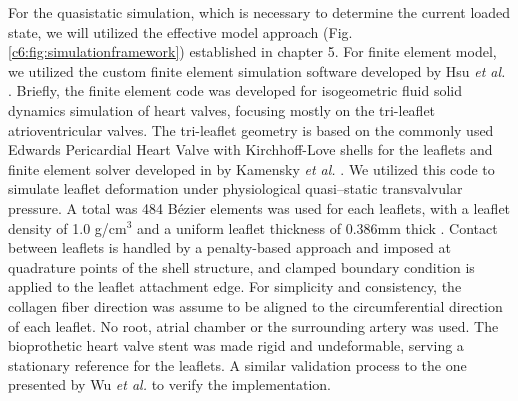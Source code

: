 	For the quasistatic simulation, which is necessary to determine the current loaded state, we will utilized the effective model approach (Fig. \ref{c6:fig:simulationframework}) established in chapter 5. For finite element model, we utilized the custom finite element simulation software developed by Hsu \textit{et al.} \cite{hsu_dynamic_2015, kamensky_immersogeometric_2015, kiendl_isogeometric_2015, wu_anisotropic_2018}. Briefly, the finite element code was developed for isogeometric fluid solid dynamics simulation of heart valves, focusing mostly on the tri-leaflet atrioventricular valves. The tri-leaflet geometry is based on the commonly used Edwards Pericardial Heart Valve with Kirchhoff-Love shells for the leaflets \cite{kiendl_isogeometric_2015} and finite element solver developed in by Kamensky \textit{et al.} \cite {kamensky_immersogeometric_2015}. We utilized this code to simulate leaflet deformation under physiological quasi--static transvalvular pressure. 
    A total was 484 B\'ezier elements was used for each leaflets, with a leaflet density of 1.0 g/cm$^3$ and a uniform leaflet thickness of 0.386mm thick \cite{hsu_dynamic_2015}. Contact between leaflets is handled by a penalty-based approach and imposed at quadrature points of the shell structure, and clamped boundary condition is applied to the leaflet attachment edge. 
    For simplicity and consistency, the collagen fiber direction was assume to be aligned to the circumferential direction of each leaflet. No root, atrial chamber or the surrounding artery was used. The bioprothetic heart valve stent was made rigid and undeformable, serving a stationary reference for the leaflets. A similar validation process to the one presented by Wu \textit{et al.} \cite{wu_anisotropic_2018} to verify the implementation.
	
